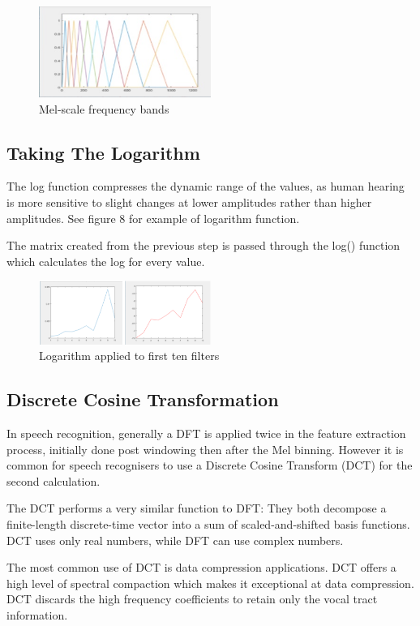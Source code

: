 \documentclass[	DIV=calc,%
							paper=a4,%
							fontsize=9.8pt,%
							twocolumn]{scrartcl}	 					%
\begin{document}
\begin{figure}[ht]
	\centering
	\includegraphics[width=0.5\textwidth]{mel}
	\captionsetup{justification=centering}
	\caption{Mel-scale frequency bands}
\end{figure}

\subsection{Taking The Logarithm}
The log function compresses the dynamic range of the values, as human hearing is more sensitive to slight changes at lower amplitudes rather than higher amplitudes. See figure 8 for example of logarithm function. 

The matrix created from the previous step is passed through the log() function which calculates the log for every value.
\begin{figure}[ht]
	\centering
	\includegraphics[width=0.5\textwidth]{log}
	\captionsetup{justification=centering}
	\caption{Logarithm applied to first ten filters}
\end{figure}

\subsection{Discrete Cosine Transformation}
In speech recognition, generally a DFT is applied twice in the feature extraction process, initially done post windowing then after the Mel binning. However it is common for speech recognisers to use a Discrete Cosine Transform (DCT) for the second calculation.

The DCT performs a very similar function to DFT: They both decompose a finite-length discrete-time vector into a sum of scaled-and-shifted basis functions. DCT uses only real numbers, while DFT can use complex numbers.

The most common use of DCT is data compression applications. DCT offers a high level of spectral compaction which makes it exceptional at data 
compression. DCT discards the high frequency coefficients to retain only the vocal tract information.
\end{document}
